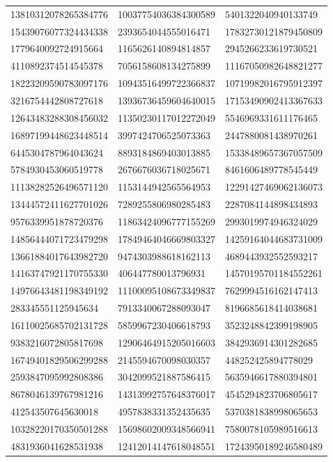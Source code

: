 \begin{longtable}{*{3}{l}}
13810312078265384776&10037754036384300589&5401322040940133749\\
15439076077324434338&2393654044555016471&17832730121879450809\\
1779640092724915664&1165626140894814857&2945266233619730521\\
4110892374514545378&7056158608134275899&11167050982648821277\\
18223209590783097176&10943516499722366837&10719982016795912397\\
3216754442808727618&13936736459604640015&17153490902413367633\\
12643483288308456032&11350230117012272049&5546969331611176465\\
16897199448623448514&3997424706525073363&2447880081438970261\\
6445304787964043624&8893184869403013885&15338489657367057509\\
5784930453060519778&2676676036718025671&8461606489778545449\\
11138282526496571120&1153144942565564953&12291427469062136073\\
13444572411627701026&7289255806980285483&2287084144898434893\\
9576339951878720376&11863424096777155269&2993019974946324029\\
14856444071723479298&17849464046669803327&14259164044683731009\\
13661884017643982720&9474303988618162113&4689443932552593217\\
14163747921170755330&406447780013796931&14570195701184552261\\
14976643481198349192&11100095108673349837&7629994516162147413\\
283345551125945634&7913340067288093047&8196685618414038681\\
16110025685702131728&5859967230406618793&3523248842399198905\\
9383216072805817698&12906464915205016603&3842936914301282685\\
16749401829506299288&2145594670098030357&448252425894778029\\
2593847095992808386&3042099521887586415&5635946617880394801\\
8678046139767981216&14313992757648376017&4545294823706805617\\
412543507645630018&4957838331352435635&5370381838998065653\\
10328220170350501288&15698602009348566941&7580078105989516613\\
4831936041628531938&12412014147618048551&17243950189246580489\\

\end{longtable}

